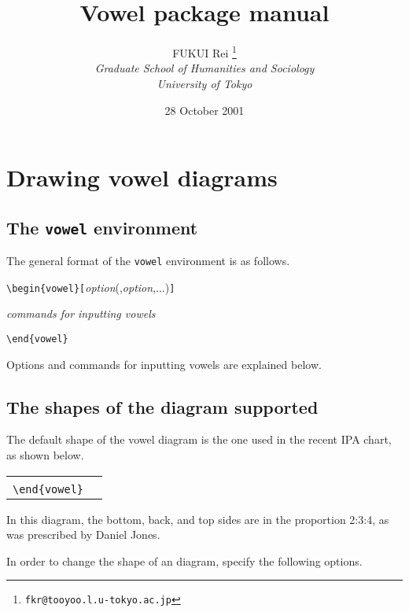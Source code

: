 \documentclass[a4paper]{article}
\title{Vowel package manual}
\author{FUKUI Rei
  \thanks{{\tt fkr@tooyoo.l.u-tokyo.ac.jp}}\\
  \textit{Graduate School of Humanities and Sociology}\\
  \textit{University of Tokyo}}
\date{28 October 2001}
\begin{document}
\maketitle

\section{Drawing vowel diagrams}

\subsection{The {\tt vowel} environment}

The general format of the {\tt vowel} environment is as follows.

\medskip

\verb|\begin{vowel}[|{\it option\/}(,{\it option},...)\verb|]|

{\it commands for inputting vowels}

\verb|\end{vowel}|

\medskip

Options and commands for inputting vowels are explained below.

\subsection{The shapes of the diagram supported}

The default shape of the vowel diagram is the one used in the recent
IPA chart, as shown below.

\begin{center}
\begin{tabular}{ll}
  \begin{vowel}[t]
  \end{vowel} &
  \begin{minipage}[t]{5.5cm}
    \verb|\begin{vowel}|\\
    \verb|\end{vowel}|
  \end{minipage}
\end{tabular}
\end{center}

In this diagram, the bottom, back, and top sides are in the proportion
2:3:4, as was prescribed by Daniel Jones.

In order to change the shape of an diagram, specify the following
options.
\end{document}
